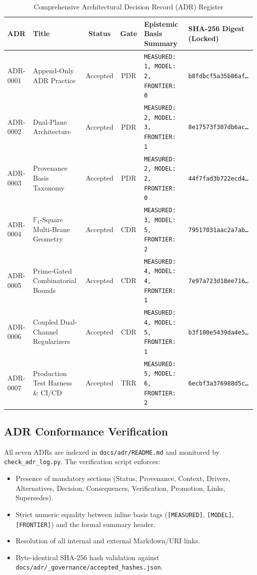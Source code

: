 \documentclass[11pt,a4paper]{article}
\theoremstyle{definition}
\theoremstyle{remark}
\begin{document}
\begin{table}[t]
\centering
\caption{Comprehensive Architectural Decision Record (ADR) Register}
\label{tab:adr_register}
\footnotesize
\begin{tabularx}{\textwidth}{llccp{5.5cm}l}
\toprule
\textbf{ADR} & \textbf{Title} & \textbf{Status} & \textbf{Gate} & \textbf{Epistemic Basis Summary} & \textbf{SHA-256 Digest (Locked)} \\
\midrule
ADR-0001 & Append-Only ADR Practice & Accepted & PDR & \texttt{MEASURED: 1, MODEL: 2, FRONTIER: 0} & \texttt{b8fdbcf5a35b86af\dots} \\
ADR-0002 & Dual-Plane Architecture & Accepted & PDR & \texttt{MEASURED: 2, MODEL: 3, FRONTIER: 1} & \texttt{8e17573f307db6ac\dots} \\
ADR-0003 & Provenance Basis Taxonomy & Accepted & PDR & \texttt{MEASURED: 2, MODEL: 2, FRONTIER: 0} & \texttt{44f7fad3b722ecd4\dots} \\
ADR-0004 & $\mathbb{F}_1$-Square Multi-Brane Geometry & Accepted & CDR & \texttt{MEASURED: 3, MODEL: 5, FRONTIER: 2} & \texttt{79517031aac2a7ab\dots} \\
ADR-0005 & Prime-Gated Combinatorial Bounds & Accepted & CDR & \texttt{MEASURED: 4, MODEL: 4, FRONTIER: 1} & \texttt{7e97a723d18ee716\dots} \\
ADR-0006 & Coupled Dual-Channel Regularizers & Accepted & CDR & \texttt{MEASURED: 4, MODEL: 5, FRONTIER: 1} & \texttt{b3f100e5439da4e5\dots} \\
ADR-0007 & Production Test Harness \& CI/CD & Accepted & TRR & \texttt{MEASURED: 5, MODEL: 6, FRONTIER: 2} & \texttt{6ecbf3a376988d5c\dots} \\
\bottomrule
\end{tabularx}
\end{table}

\subsection{ADR Conformance Verification}
All seven ADRs are indexed in \texttt{docs/adr/README.md} and monitored by \texttt{check\_adr\_log.py}. The verification script enforces:
\begin{itemize}
    \item Presence of mandatory sections (Status, Provenance, Context, Drivers, Alternatives, Decision, Consequences, Verification, Promotion, Links, Supersedes).
    \item Strict numeric equality between inline basis tags (\texttt{[MEASURED]}, \texttt{[MODEL]}, \texttt{[FRONTIER]}) and the formal summary header.
    \item Resolution of all internal and external Markdown/URI links.
    \item Byte-identical SHA-256 hash validation against \texttt{docs/adr/\_governance/accepted\_hashes.json}.
\end{itemize}
\end{document}
